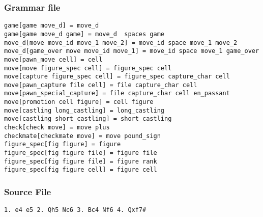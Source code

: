 \documentclass[a4paper,10pt]{article}
\begin{document}
\subsubsection{Grammar file}
\begin{verbatim}
game[game move_d] = move_d 
game[game move_d game] = move_d  spaces game
move_d[move move_id move_1 move_2] = move_id space move_1 move_2
move_d[game_over move move_id move_1] = move_id space move_1 game_over
move[pawn_move cell] = cell
move[move figure_spec cell] = figure_spec cell
move[capture figure_spec cell] = figure_spec capture_char cell
move[pawn_capture file cell] = file capture_char cell
move[pawn_special_capture] = file capture_char cell en_passant
move[promotion cell figure] = cell figure
move[castling long_castling] = long_castling
move[castling short_castling] = short_castling
check[check move] = move plus
checkmate[checkmate move] = move pound_sign
figure_spec[fig figure] = figure
figure_spec[fig figure file] = figure file
figure_spec[fig figure file] = figure rank
figure_spec[fig figure cell] = figure cell
\end{verbatim}

\subsubsection{Source File}
\begin{comment}
\begin{verbatim}

1. e4 c5 2. Nf3 d6 3. Bb5+ Bd7 4. Bxd7+ Qxd7 5. c4 Nc6 6. Nc3 Nf6 
7. 0-0 g6 8. d4 cxd4 9. Nxd4 Bg7 10. Nde2 Qe6  11. Nd5 Qxe4 
12. Nc7+ Kd7 13. Nxa8 Qxc4 14. Nb6+ axb6 15. Nc3 Ra8 16. a4 Ne4 
17. Nxe4 Qxe4 18. Qb3 f5 19. Bg5 Qb4 20. Qf7 Be5 21. h3 Rxa4 
22. Rxa4 Qxa4 23. Qxh7 Bxb2 24. Qxg6 Qe4 25. Qf7 Bd4 26. Qb3 f4 
27. Qf7 Be5 28. h4 b5 29. h5 Qc4 30. Qf5+ Qe6 31. Qxe6+ Kxe6 
32. g3 fxg3 33. fxg3 b4 34. Bf4 Bd4+ 
35. Kh1! b3 36. g4 Kd5 37. g5 e6 38. h6 Ne7 39. Rd1 e5 40. Be3 Kc4 
41. Bxd4 exd4 42. Kg2 b2 43. Kf3 Kc3 44. h7 Ng6 45. Ke4 Kc2 
46. Rh1 d3 47. Kf5 b1=Q 48. Rxb1 Kxb1 49. Kxg6 d2 50. h8=Q d1=Q 
51. Qh7 b5 52. Kf6+ Kb2 53. Qh2+ Ka1 54. Qf4 b4 55. Qxb4 Qf3+ 
56. Kg7 d5 57. Qd4+ Kb1 58. g6 Qe4 59. Qg1+ Kb2 60. Qf2+ Kc1 
61. Kf6 d4 62. g7 1-0 
\end{verbatim}
\end{comment}

\begin{verbatim}
1. e4 e5 2. Qh5 Nc6 3. Bc4 Nf6 4. Qxf7# 
\end{verbatim}
\end{document}
